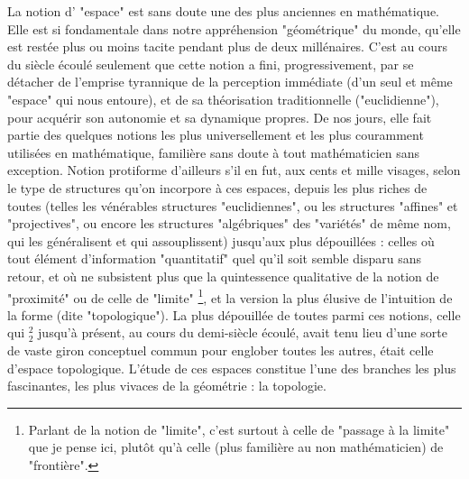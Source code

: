 La notion d' "espace" est sans doute une des plus anciennes en mathématique. Elle est si fondamentale dans notre appréhension "géométrique" du monde, qu'elle est restée plus ou moins tacite pendant plus de deux millénaires. C'est au cours du siècle écoulé seulement que cette notion a fini, progressivement, par se détacher de l'emprise tyrannique de la perception immédiate (d'un seul et même "espace" qui nous entoure), et de sa théorisation traditionnelle ("euclidienne"), pour acquérir son autonomie et sa dynamique propres. De nos jours, elle fait partie des quelques notions les plus universellement et les plus couramment utilisées en mathématique, familière sans doute à tout mathématicien sans exception. Notion protiforme d'ailleurs s'il en fut, aux cents et mille visages, selon le type de structures qu'on incorpore à ces espaces, depuis les plus riches de toutes (telles les vénérables structures "euclidiennes", ou les structures "affines" et "projectives", ou encore les structures "algébriques" des "variétés" de même nom, qui les généralisent et qui assouplissent) jusqu'aux plus dépouillées : celles où tout élément d'information "quantitatif" quel qu'il soit semble disparu sans retour, et où ne subsistent plus que la quintessence qualitative de la notion de "proximité" ou de celle de "limite" \footnote{Parlant de la notion de "limite", c'est surtout à celle de "passage à la limite" que je pense ici, plutôt qu'à celle (plus familière au non mathématicien) de "frontière".}, et la version la plus élusive de l'intuition de la forme (dite "topologique"). La plus dépouillée de toutes parmi ces notions, celle qui ${ }_{2}^{2}$ jusqu'à présent, au cours du demi-siècle écoulé, avait tenu lieu d'une sorte de vaste giron conceptuel commun pour englober toutes les autres, était celle d'espace topologique. L'étude de ces espaces constitue l'une des branches les plus fascinantes, les plus vivaces de la géométrie : la topologie.

